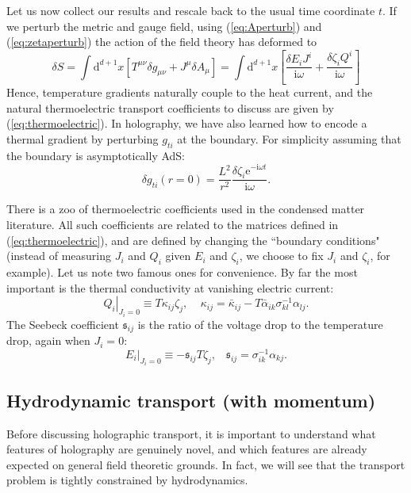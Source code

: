 \documentclass[10pt, oneside]{book}
\begin{document}
\begin{doublespace}
Let us now collect our results and rescale back to the usual time coordinate $t$.   If we perturb the metric and gauge field, using (\ref{eq:Aperturb}) and (\ref{eq:zetaperturb}) the action of the field theory has deformed to \begin{equation}
\delta S = \int \mathrm{d}^{d+1}x \left[T^{\mu\nu}\delta g_{\mu\nu} + J^\mu \delta A_\mu \right] = \int \mathrm{d}^{d+1}x \left[\frac{\delta E_i J^i}{\mathrm{i}\omega} + \frac{\delta \zeta_i Q^i}{\mathrm{i}\omega}  \right]
\end{equation}
Hence, temperature gradients naturally couple to the heat current, and the natural thermoelectric transport coefficients to discuss are given by (\ref{eq:thermoelectric}).  In holography, we have also learned how to encode a thermal gradient by perturbing $g_{ti}$ at the boundary.   For simplicity assuming that the boundary is asymptotically AdS: \begin{equation}
\delta g_{ti}(r=0) = \frac{L^2}{r^2} \frac{\delta \zeta_i \mathrm{e}^{-\mathrm{i}\omega t}}{\mathrm{i}\omega}.
\end{equation}

There is a zoo of thermoelectric coefficients used in the condensed matter literature.   All such coefficients are related to the matrices defined in (\ref{eq:thermoelectric}), and are defined by changing the ``boundary conditions" (instead of measuring $J_i$ and $Q_i$ given $E_i$ and $\zeta_i$, we choose to fix $J_i$ and $\zeta_i$, for example).   Let us note two famous ones for convenience.  By far the most important is the thermal conductivity at vanishing electric current: \begin{equation}
\left.Q_i\right|_{J_i=0} \equiv T\kappa_{ij} \zeta_j, \;\;\;\; \kappa_{ij} = \bar\kappa_{ij} - T\bar\alpha_{ik}\sigma^{-1}_{kl}\alpha_{lj}.   \label{eq:kappadef}
\end{equation}
The Seebeck coefficient $\mathfrak{s}_{ij}$ is the ratio of the voltage drop to the temperature drop, again when $J_i=0$: \begin{equation}
\left.E_i \right|_{J_i=0} \equiv -\mathfrak{s}_{ij}T\zeta_j, \;\;\; \mathfrak{s}_{ij} = \sigma^{-1}_{ik}\alpha_{kj}.
\end{equation}

\subsection{Hydrodynamic transport (with momentum)}
Before discussing holographic transport, it is important to understand what features of holography are genuinely novel, and which features are already expected on general field theoretic grounds.   In fact, we will see that the transport problem is tightly constrained by hydrodynamics.


\end{doublespace}
\end{document}
